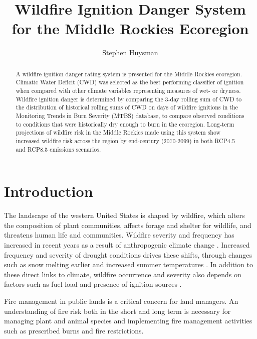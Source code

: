 \documentclass[11pt]{article}
\author{Stephen Huysman}
\title{Wildfire Ignition Danger System for the Middle Rockies Ecoregion}
\begin{document}
\maketitle


\begin{abstract}
A wildfire ignition danger rating system is presented for the Middle Rockies ecoregion.  Climatic Water Deficit (CWD) was selected as the best performing classifier of ignition when compared with other climate variables representing measures of wet- or dryness.  Wildfire ignition danger is determined by comparing the 3-day rolling sum of CWD to the distribution of historical rolling sums of CWD on days of wildfire ignitions in the Monitoring Trends in Burn Severity (MTBS) database, to compare observed conditions to conditions that were historically dry enough to burn in the ecoregion. Long-term projections of wildfire risk in the Middle Rockies made using this system show increased wildfire risk across the region by end-century (2070-2099) in both RCP4.5 and RCP8.5 emissions scenarios.
  
\end{abstract}

\section{Introduction}

The landscape of the western United States is shaped by wildfire, which alters the composition of plant communities, affects forage and shelter for wildlife, and threatens human life and communities.  Wildfire severity and frequency has increased in recent years as a result of anthropogenic climate change \citep{abatzoglouImpactAnthropogenicClimate2016}.  Increased frequency and severity of drought conditions drives these shifts, through changes such as snow melting earlier \citep{tercekForecasts21stCentury2016} and increased summer temperatures \citep{runningGlobalWarmingCausing2006}.  In addition to these direct links to climate, wildfire occurrence and severity also depends on factors such as fuel load and presence of ignition sources \citep{mckenzieClimateChangeEcohydrology2017}.

Fire management in public lands is a critical concern for land managers.  An understanding of fire risk both in the short and long term is necessary for managing plant and animal species and implementing fire management activities such as prescribed burns and fire restrictions.  
\end{document}
